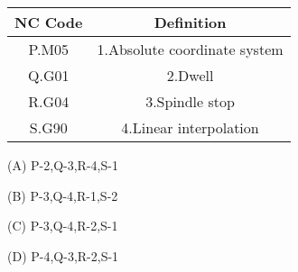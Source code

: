 \documentclass[journal]{IEEEtran}
\begin{document}
\begin{enumerate}[start=37]
	\begin{table}[h]
		\centering
		\begin{tabular}{|c|c|}
			\hline \textbf{NC Code} & \textbf{Definition} \\ \hline P.M05 & 1.Absolute coordinate system \\ \hline Q.G01 & 2.Dwell \\ \hline R.G04 & 3.Spindle stop \\ \hline S.G90 & 4.Linear interpolation \\ \hline
		\end{tabular}
	\end{table}
\begin{enumerate}
\begin{multicols}{2}
\item [(A)] P-2,Q-3,R-4,S-1
\item [(B)] P-3,Q-4,R-1,S-2
\item [(C)] P-3,Q-4,R-2,S-1
\item [(D)] P-4,Q-3,R-2,S-1
\end{multicols}
\end{enumerate}
\end{enumerate}
\end{document}
